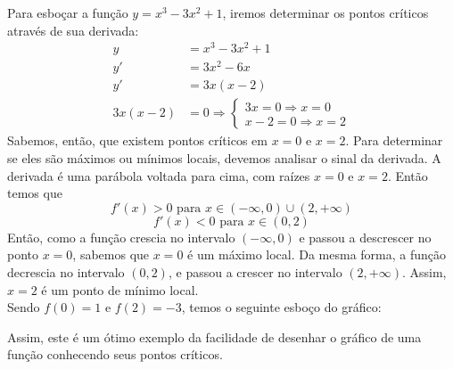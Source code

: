 \begin{exemplo}
Para esboçar a função $y=x^3-3x^2+1$, iremos determinar os pontos críticos através de sua derivada:
\begin{align*}
y&=x^3-3x^2+1 \\
y'&=3x^2-6x\\
y'&=3x(x-2) \\
3x(x-2)&=0 \Rightarrow\begin{cases}
3x=0 \Rightarrow x=0 \\
x-2=0 \Rightarrow x=2
\end{cases}
\end{align*}
Sabemos, então, que existem pontos críticos em $x=0$ e $x=2$. Para determinar se eles são máximos ou mínimos locais, devemos analisar o sinal da derivada. A derivada é uma parábola voltada para cima, com raízes $x=0$ e $x=2$. Então temos que
\[f'(x)>0 \textrm{ para } x\in (-\infty,0) \cup (2, +\infty)\]
\[f'(x)<0 \textrm{ para } x \in (0,2)\]
Então, como a função crescia no intervalo $(-\infty,0)$ e passou a descrescer no ponto $x=0$, sabemos que $x=0$ é um máximo local. Da mesma forma, a função decrescia no intervalo $(0,2)$, e passou a crescer no intervalo $(2,+\infty)$. Assim, $x=2$ é um ponto de mínimo local. \\ Sendo $f(0)=1$ e $f(2)=-3$, temos o seguinte esboço do gráfico:
\begin{center}
\end{center}
Assim, este é um ótimo exemplo da facilidade de desenhar o gráfico de uma função conhecendo seus pontos críticos.
\end{exemplo}

